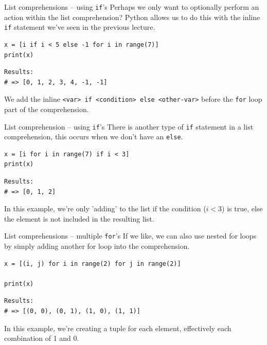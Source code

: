 \documentclass[10pt]{beamer}
\begin{document}
\begin{frame}[label={sec:orgac04e55},fragile]{List comprehensions -- using \texttt{if}'s}
 Perhaps we only want to optionally perform an action within the list comprehension?
Python allows us to do this with the inline \texttt{if} statement we've seen in the previous lecture.

\begin{verbatim}
x = [i if i < 5 else -1 for i in range(7)]
print(x)
\end{verbatim}

\begin{verbatim}
Results: 
# => [0, 1, 2, 3, 4, -1, -1]
\end{verbatim}


We add the inline \texttt{<var> if <condition> else <other-var>} before the \texttt{for} loop part of
the comprehension.
\end{frame}

\begin{frame}[label={sec:org86cdb7b},fragile]{List comprehension -- using \texttt{if}'s}
 There is another type of \texttt{if} statement in a list comprehension, this occurs when we
don't have an \texttt{else}.

\begin{verbatim}
x = [i for i in range(7) if i < 3]
print(x)
\end{verbatim}

\begin{verbatim}
Results: 
# => [0, 1, 2]
\end{verbatim}


In this example, we're only 'adding' to the list if the condition (\(i < 3\)) is true,
else the element is not included in the resulting list.
\end{frame}

\begin{frame}[label={sec:org6412dd7},fragile]{List comprehensions -- multiple \texttt{for}'s}
 If we like, we can also use nested for loops by simply adding another for loop into
the comprehension.

\begin{verbatim}
x = [(i, j) for i in range(2) for j in range(2)]

print(x)
\end{verbatim}

\begin{verbatim}
Results: 
# => [(0, 0), (0, 1), (1, 0), (1, 1)]
\end{verbatim}


In this example, we're creating a tuple for each element, effectively each
combination of 1 and 0.
\end{frame}
\end{document}
